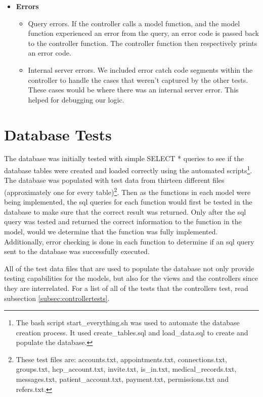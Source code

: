 \begin{itemize}
\begin{itemize}
\end{itemize}
\item \textbf{Errors}
\begin{itemize} 
\item Query errors. If the controller calls a model function, and the model function experienced an error from the query, an error code is passed back to the controller function. The controller function then respectively prints an error code. 
\item Internal server errors. We included error catch code segments within the controller to handle the cases that weren't captured by the other tests. These cases would be where there was an internal server error. This helped for debugging our logic.  
\end{itemize}
\end{itemize}


\section{Database Tests}
The database was initially tested with simple SELECT * queries to see if the database tables were created and loaded correctly using the automated scripts\footnote{The bash script start\_everything.sh was used to automate the database creation process.  It used create\_tables.sql and load\_data.sql to create and populate the database.}. The database was populated with test data from thirteen different files (approximately one for every table)\footnote{These test files are: accounts.txt, appointments.txt, connections.txt, groups.txt, hcp\_account.txt, invite.txt, is\_in.txt, medical\_records.txt, messages.txt, patient\_account.txt, payment.txt, permissions.txt and refers.txt.}.  Then as the functions in each model were being implemented, the sql queries for each function would first be tested in the database to make sure that the correct result was returned.  Only after the sql query was tested and returned the correct information to the function in the model, would we determine that the function was fully implemented.  Additionally, error checking is done in each function to determine if an sql query sent to the database was successfully executed.

All of the test data files that are used to populate the database not only provide testing capabilities for the models, but also for the views and the controllers since they are interrelated.  For a list of all of the tests that the controllers test, read subsection \ref{subsec:controllertests}.


